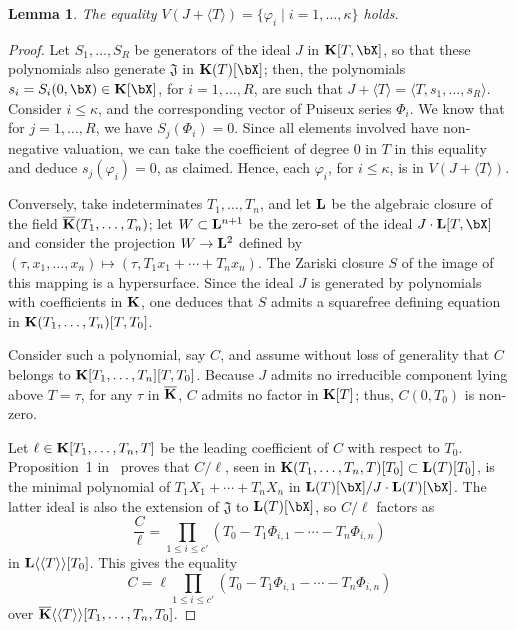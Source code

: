 \documentclass[12pt]{article}
\newtheorem{lemma}[definition]{Lemma}
\begin{document}
\begin{lemma}\label{lemma:Z1}
  The equality $V(J +\langle T \rangle)=\{\varphi_i \mid i=1,\dots,\kappa\}$ holds.
\end{lemma}
\begin{proof}
  Let $S_1,\dots,S_R$ be generators of the ideal $J$ in
  $\KK[T,\bX]$, so that these polynomials also generate
  $\mathfrak{J}$ in $\KK(T)[\bX]$; then, the polynomials
  $s_i=S_i(0,\bX) \in \KK[\bX]$, for $i=1,\dots,R$, are such that
  $J+\langle T\rangle = \langle T,s_1,\dots,s_R \rangle$.  Consider
  $i \le \kappa$, and the corresponding vector of Puiseux series
  $\Phi_i$. We know that for $j=1,\dots,R$, we have $S_j(\Phi_i)=0$.
  Since all elements involved have non-negative valuation, we can take
  the coefficient of degree $0$ in $T$ in this equality and deduce
  $s_j(\varphi_i)=0$, as claimed. Hence, each $\varphi_i$, for $i \le
  \kappa$, is in $V(J + \langle T \rangle)$.

  Conversely, take indeterminates $T_1,\dots,T_n$, and let $\mathbf{L}$ be
  the algebraic closure of the field $\overline{\mathbf{K}}(T_1,\dots,T_n)$; let
  $W\subset{\ensuremath{\mathbf{L}}}{}^{n+1}$ be the zero-set of the ideal $J\cdot
  \LL[T,\bX]$ and consider the projection $W \to {\ensuremath{\mathbf{L}}}{}^2$ defined
  by $(\tau,x_1,\dots,x_n)\mapsto (\tau,T_1 x_1 + \cdots + T_n x_n)$. The
  Zariski closure $S$ of the image of this mapping is a
  hypersurface. 
  Since
  the ideal $J$ is generated by polynomials with coefficients in $\mathbf{K}$,
  one deduces that $S$ admits a squarefree defining equation in
  $\mathbf{K}(T_1,\dots,T_n)[T,T_0]$.

  Consider such a polynomial, say $C$, and assume without loss of
  generality that $C$ belongs to 
  $\mathbf{K}[T_1,\dots,T_n][T,T_0]$. Because $J$ admits no irreducible
  component lying above $T=\tau$, for any $\tau$ in $\overline{\mathbf{K}}$, $C$
  admits no factor in $\mathbf{K}[T]$; thus, $C(0,T_0)$ is non-zero.

  Let $\ell \in \mathbf{K}[T_1,\dots,T_n,T]$ be the leading coefficient of
  $C$ with respect to $T_0$. Proposition~1 in~\cite{Schost03} proves
  that $C/\ell$, seen in $\mathbf{K}(T_1,\dots,T_n,T)[T_0] \subset
  \mathbf{L}(T)[T_0]$, is the minimal polynomial of $T_1 X_1 + \cdots +
  T_n X_n$ in $\LL(T)[\bX]/J\cdot \LL(T)[\bX]$. The latter ideal
  is also the extension of $\mathfrak{J}$ to $\LL(T)[\bX]$, 
  so $C/\ell$ factors as
  $$\frac C\ell = \prod_{1\le i \le c'}(T_0-T_1 \Phi_{i,1} - \cdots - T_n \Phi_{i,n})$$
  in $\mathbf{L}\langle\langle T \rangle\rangle[T_0]$.
  This gives the equality 
  $$C =\ell \prod_{1\le i \le  c'}(T_0-T_1 \Phi_{i,1} - \cdots - T_n
  \Phi_{i,n})$$ over $\overline{\mathbf{K}}\langle\langle T \rangle\rangle[T_1,\dots,T_n,T_0]$. 


\end{proof}
\end{document}
